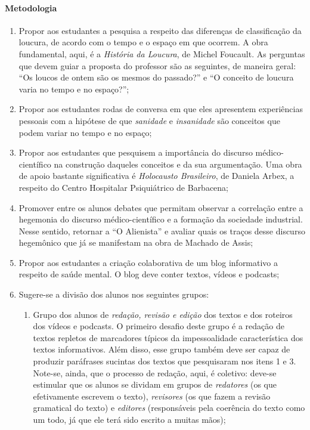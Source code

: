 \documentclass{extarticle}
\begin{document}
\paragraph{Metodologia}
\begin{enumerate}
\item Propor aos estudantes a pesquisa a respeito das diferenças de
classificação da loucura, de acordo com o tempo e o espaço em que
ocorrem. A obra fundamental, aqui, é a \emph{História da Loucura}, de
Michel Foucault. As perguntas que devem guiar a proposta do professor
são as seguintes, de maneira geral: ``Os loucos de ontem são os mesmos
do passado?'' e ``O conceito de loucura varia no tempo e no espaço?'';

\item Propor aos estudantes rodas de conversa em que eles apresentem
experiências pessoais com a hipótese de que \emph{sanidade} e
\emph{insanidade} são conceitos que podem variar no tempo e no espaço;

\item Propor aos estudantes que pesquisem a importância do discurso
médico-científico na construção daqueles conceitos e da sua
argumentação. Uma obra de apoio bastante significativa é
\emph{Holocausto Brasileiro}, de Daniela Arbex, a respeito do Centro
Hospitalar Psiquiátrico de Barbacena;

\item Promover entre os alunos debates que permitam observar a correlação
entre a hegemonia do discurso médico-científico e a formação da
sociedade industrial. Nesse sentido, retornar a ``O Alienista'' e
avaliar quais os traços desse discurso hegemônico que já se manifestam
na obra de Machado de Assis;

\item Propor aos estudantes a criação colaborativa de um blog informativo a
respeito de saúde mental. O blog deve conter textos, vídeos e podcasts;

\item Sugere-se a divisão dos alunos nos seguintes grupos:

\begin{enumerate}
\item Grupo dos alunos de \emph{redação, revisão e edição} dos textos e dos
roteiros dos vídeos e podcasts. O primeiro desafio deste grupo é a
redação de textos repletos de marcadores típicos da impessoalidade
característica dos textos informativos. Além disso, esse grupo também
deve ser capaz de produzir paráfrases sucintas dos textos que
pesquisaram nos itens 1 e 3. Note-se, ainda, que o processo de redação,
aqui, é coletivo: deve-se estimular que os alunos se dividam em grupos
de \emph{redatores} (os que efetivamente escrevem o texto),
\emph{revisores} (os que fazem a revisão gramatical do texto) e
\emph{editores} (responsáveis pela coerência do texto como um todo, já
que ele terá sido escrito a muitas mãos);


\end{enumerate}
\end{enumerate}
\end{document}
